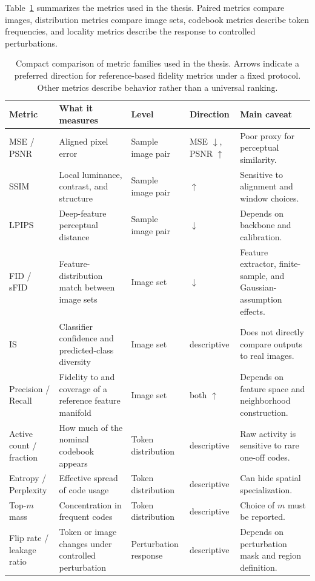 Table~\ref{tab:metric_comparison_summary} summarizes the metrics used in the
thesis. Paired metrics compare images, distribution metrics compare image sets,
codebook metrics describe token frequencies, and locality metrics describe the
response to controlled perturbations.

\begin{table}[t]
    \centering
    \scriptsize
    \renewcommand{\arraystretch}{1.18}
    \setlength{\tabcolsep}{3pt}
    \begin{tabularx}{\textwidth}{>{\raggedright\arraybackslash}p{} >{\raggedright\arraybackslash}p{} >{\raggedright\arraybackslash}p{} >{\raggedright\arraybackslash}p{} >{\raggedright\arraybackslash}X}
        \textbf{Metric} & \textbf{What it measures} & \textbf{Level} & \textbf{Direction} & \textbf{Main caveat} \\ \hline
        MSE / PSNR & Aligned pixel error & Sample image pair & MSE $\downarrow$, PSNR $\uparrow$ & Poor proxy for perceptual similarity. \\
        SSIM & Local luminance, contrast, and structure & Sample image pair & $\uparrow$ & Sensitive to alignment and window choices. \\
        LPIPS & Deep-feature perceptual distance & Sample image pair & $\downarrow$ & Depends on backbone and calibration. \\
        FID / sFID & Feature-distribution match between image sets & Image set & $\downarrow$ & Feature extractor, finite-sample, and Gaussian-assumption effects. \\
        IS & Classifier confidence and predicted-class diversity & Image set & descriptive & Does not directly compare outputs to real images. \\
        Precision / Recall & Fidelity to and coverage of a reference feature manifold & Image set & both $\uparrow$ & Depends on feature space and neighborhood construction. \\
        Active count / fraction & How much of the nominal codebook appears & Token distribution & descriptive & Raw activity is sensitive to rare one-off codes. \\
        Entropy / Perplexity & Effective spread of code usage & Token distribution & descriptive & Can hide spatial specialization. \\
        Top-$m$ mass & Concentration in frequent codes & Token distribution & descriptive & Choice of $m$ must be reported. \\
        Flip rate / leakage ratio & Token or image changes under controlled perturbation & Perturbation response & descriptive & Depends on perturbation mask and region definition. \\
    \end{tabularx}
    \caption{Compact comparison of metric families used in the thesis. Arrows indicate a preferred direction for reference-based fidelity metrics under a fixed protocol. Other metrics describe behavior rather than a universal ranking.}
    \label{tab:metric_comparison_summary}
\end{table}
